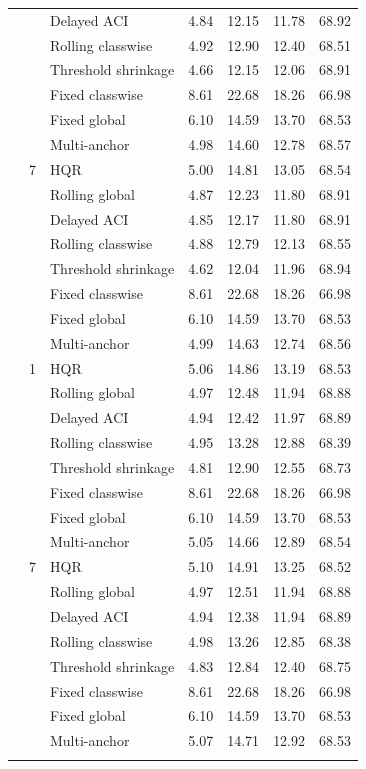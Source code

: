 \begin{table}[p]
\begin{tabular}{rrlrrrr}
 &  & Delayed ACI & 4.84 & 12.15 & 11.78 & 68.92 \\
 &  & Rolling classwise & 4.92 & 12.90 & 12.40 & 68.51 \\
 &  & Threshold shrinkage & 4.66 & 12.15 & 12.06 & 68.91 \\
 &  & Fixed classwise & 8.61 & 22.68 & 18.26 & 66.98 \\
 &  & Fixed global & 6.10 & 14.59 & 13.70 & 68.53 \\
 &  & Multi-anchor & 4.98 & 14.60 & 12.78 & 68.57 \\
\addlinespace
128 & 7 & HQR & 5.00 & 14.81 & 13.05 & 68.54 \\
 &  & Rolling global & 4.87 & 12.23 & 11.80 & 68.91 \\
 &  & Delayed ACI & 4.85 & 12.17 & 11.80 & 68.91 \\
 &  & Rolling classwise & 4.88 & 12.79 & 12.13 & 68.55 \\
 &  & Threshold shrinkage & 4.62 & 12.04 & 11.96 & 68.94 \\
 &  & Fixed classwise & 8.61 & 22.68 & 18.26 & 66.98 \\
 &  & Fixed global & 6.10 & 14.59 & 13.70 & 68.53 \\
 &  & Multi-anchor & 4.99 & 14.63 & 12.74 & 68.56 \\
\addlinespace
512 & 1 & HQR & 5.06 & 14.86 & 13.19 & 68.53 \\
 &  & Rolling global & 4.97 & 12.48 & 11.94 & 68.88 \\
 &  & Delayed ACI & 4.94 & 12.42 & 11.97 & 68.89 \\
 &  & Rolling classwise & 4.95 & 13.28 & 12.88 & 68.39 \\
 &  & Threshold shrinkage & 4.81 & 12.90 & 12.55 & 68.73 \\
 &  & Fixed classwise & 8.61 & 22.68 & 18.26 & 66.98 \\
 &  & Fixed global & 6.10 & 14.59 & 13.70 & 68.53 \\
 &  & Multi-anchor & 5.05 & 14.66 & 12.89 & 68.54 \\
\addlinespace
512 & 7 & HQR & 5.10 & 14.91 & 13.25 & 68.52 \\
 &  & Rolling global & 4.97 & 12.51 & 11.94 & 68.88 \\
 &  & Delayed ACI & 4.94 & 12.38 & 11.94 & 68.89 \\
 &  & Rolling classwise & 4.98 & 13.26 & 12.85 & 68.38 \\
 &  & Threshold shrinkage & 4.83 & 12.84 & 12.40 & 68.75 \\
 &  & Fixed classwise & 8.61 & 22.68 & 18.26 & 66.98 \\
 &  & Fixed global & 6.10 & 14.59 & 13.70 & 68.53 \\
 &  & Multi-anchor & 5.07 & 14.71 & 12.92 & 68.53 \\
\addlinespace
\bottomrule
\end{tabular}
\end{table}
